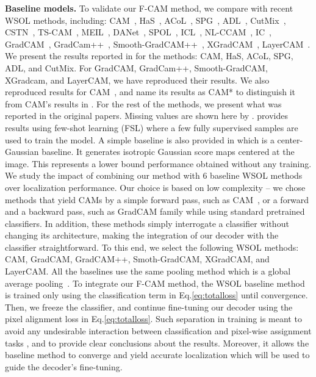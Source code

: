 \documentclass[twocolumn]{article}
\theoremstyle{definition}
\begin{document}
\noindent \textbf{Baseline models.}
To validate our F-CAM method, we compare with recent WSOL methods, including: CAM~\cite{zhou2016learning}, HaS~\cite{SinghL17}, ACoL~\cite{ZhangWF0H18}, SPG~\cite{ZhangWKYH18}, ADL~\cite{ChoeS19}, CutMix~\cite{YunHCOYC19}, CSTN~\cite{MeethalPBG20icprcstn}, TS-CAM~\cite{gao2021tscam}, MEIL~\cite{Mai20CVPRmeil}, DANet~\cite{XueLWJJY19iccvdanet}, SPOL~\cite{wei2021shallowspol}, ICL~\cite{KiU0B20icl}, NL-CCAM~\cite{YangKKK20nlccam}, IC~\cite{ZhangW020i2c}, GradCAM~\cite{SelvarajuCDVPB17iccvgradcam}, GradCam++~\cite{ChattopadhyaySH18wacvgradcampp}, Smooth-GradCAM++~\cite{omeiza2019corr}, XGradCAM~\cite{fu2020axiom}, LayerCAM~\cite{JiangZHCW21layercam}. We present the results reported in \cite{choe2020evaluating} for the methods: CAM, HaS, ACoL, SPG, ADL, and CutMix. For GradCAM, GradCam++, Smooth-GradCAM, XGradcam, and LayerCAM, we have reproduced their results. We also reproduced results for CAM~\cite{zhou2016learning}, and name its results as CAM* to distinguish it from CAM's results in \cite{choe2020evaluating}. For the rest of the methods, we present what was reported in the original papers. Missing values are shown here by . \cite{choe2020evaluating} provides results using few-shot learning (FSL) where a few fully supervised samples are used to train the model. A simple baseline is also provided in \cite{choe2020evaluating} which is a center-Gaussian baseline. It generates isotropic Gaussian score maps centered at the image. This represents a lower bound performance obtained without any training.
We study the impact of combining our method with 6 baseline WSOL methods over localization performance. Our choice is based on low complexity -- we chose methods that yield CAMs by a simple forward pass, such as CAM~\cite{zhou2016learning}, or a forward and a backward pass, such as GradCAM family while using standard pretrained classifiers. In addition, these methods simply interrogate a classifier without changing its architecture, making the integration of our decoder with the classifier straightforward. To this end, we select the following WSOL methods: CAM, GradCAM, GradCAM++, Smoth-GradCAM, XGradCAM, and LayerCAM. All the baselines use the same pooling method which is a global average pooling~\cite{zhou2016learning}.
To integrate our F-CAM method, the WSOL baseline method is trained only using the classification term in Eq.\ref{eq:totalloss} until convergence. Then, we freeze the classifier, and continue fine-tuning our decoder using the pixel alignment loss in Eq.\ref{eq:totalloss}. Such separation in training is meant to avoid any undesirable interaction between classification and pixel-wise assignment tasks \cite{belharbi2020DeepAlJoinClSegWeakAnn}, and to provide clear conclusions about the results. Moreover, it allows the baseline method to converge and yield accurate localization which will be used to guide the decoder's fine-tuning.
\end{document}

